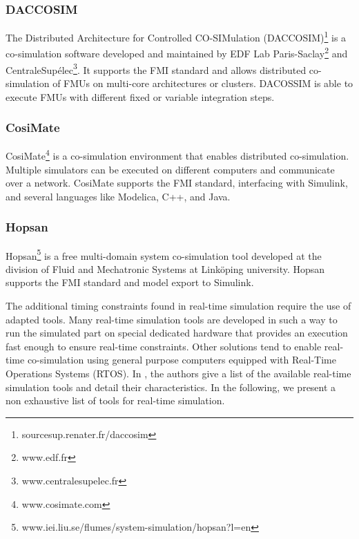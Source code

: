 \subsubsection{DACCOSIM}

The Distributed Architecture for Controlled CO-SIMulation (DACCOSIM)\footnote{sourcesup.renater.fr/daccosim} is a co-simulation software developed and maintained by EDF Lab Paris-Saclay\footnote{www.edf.fr} and CentraleSup\'{e}lec\footnote{www.centralesupelec.fr}. It supports the FMI standard and allows distributed co-simulation of FMUs on multi-core architectures or clusters. DACOSSIM is able to execute FMUs with different fixed or variable integration steps. 

\subsubsection{CosiMate}

CosiMate\footnote{www.cosimate.com} is a co-simulation environment that enables distributed co-simulation. Multiple simulators can be executed on different computers and communicate over a network. CosiMate supports the FMI standard, interfacing with Simulink, and several languages like Modelica, C++, and Java.

\subsubsection{Hopsan}
Hopsan\footnote{www.iei.liu.se/flumes/system-simulation/hopsan?l=en} is a free multi-domain system co-simulation tool developed at the division of Fluid and Mechatronic Systems at Link\"oping university. Hopsan supports the FMI standard and model export to Simulink.


The additional timing constraints found in real-time simulation require the use of adapted tools. Many real-time simulation tools are developed in such a way to run the simulated part on special dedicated hardware that provides an execution fast enough to ensure real-time constraints. Other solutions tend to enable real-time co-simulation using general purpose computers equipped with Real-Time Operations Systems (RTOS). In \cite{faruque:2015}, the authors give a list of the available real-time simulation tools and detail their characteristics. In the following, we present a non exhaustive list of tools for real-time simulation.

